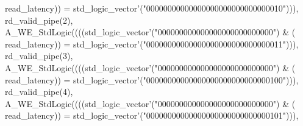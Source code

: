 \begin{DoxyCode}
{      read_latency}\textcolor{vhdlchar}{)}\textcolor{vhdlchar}{)} \textcolor{vhdlchar}{=} \textcolor{comment}{std\_logic\_vector}\textcolor{vhdlchar}{'}\textcolor{vhdlchar}{(}\textcolor{vhdllogic}{"00000000000000000000000000000010"}\textcolor{vhdlchar}{)}\textcolor{vhdlchar}{)}\textcolor{vhdlchar}{)}\textcolor{vhdlchar}{,} \textcolor{vhdlchar}{
      rd_valid_pipe}\textcolor{vhdlchar}{(}\textcolor{vhdllogic}{}\textcolor{vhdllogic}{2}\textcolor{vhdlchar}{)}\textcolor{vhdlchar}{,} \textcolor{vhdlchar}{A\_WE\_StdLogic}\textcolor{vhdlchar}{(}\textcolor{vhdlchar}{(}\textcolor{vhdlchar}{(}\textcolor{vhdlchar}{(}\textcolor{comment}{std\_logic\_vector}\textcolor{vhdlchar}{'}\textcolor{vhdlchar}{(}\textcolor{vhdllogic}{"000000000000000000000000000"}\textcolor{vhdlchar}{)} \textcolor{vhdlchar}{&} \textcolor{vhdlchar}{(}\textcolor{vhdlchar}{
      read_latency}\textcolor{vhdlchar}{)}\textcolor{vhdlchar}{)} \textcolor{vhdlchar}{=} \textcolor{comment}{std\_logic\_vector}\textcolor{vhdlchar}{'}\textcolor{vhdlchar}{(}\textcolor{vhdllogic}{"00000000000000000000000000000011"}\textcolor{vhdlchar}{)}\textcolor{vhdlchar}{)}\textcolor{vhdlchar}{)}\textcolor{vhdlchar}{,} \textcolor{vhdlchar}{
      rd_valid_pipe}\textcolor{vhdlchar}{(}\textcolor{vhdllogic}{}\textcolor{vhdllogic}{3}\textcolor{vhdlchar}{)}\textcolor{vhdlchar}{,} \textcolor{vhdlchar}{A\_WE\_StdLogic}\textcolor{vhdlchar}{(}\textcolor{vhdlchar}{(}\textcolor{vhdlchar}{(}\textcolor{vhdlchar}{(}\textcolor{comment}{std\_logic\_vector}\textcolor{vhdlchar}{'}\textcolor{vhdlchar}{(}\textcolor{vhdllogic}{"000000000000000000000000000"}\textcolor{vhdlchar}{)} \textcolor{vhdlchar}{&} \textcolor{vhdlchar}{(}\textcolor{vhdlchar}{
      read_latency}\textcolor{vhdlchar}{)}\textcolor{vhdlchar}{)} \textcolor{vhdlchar}{=} \textcolor{comment}{std\_logic\_vector}\textcolor{vhdlchar}{'}\textcolor{vhdlchar}{(}\textcolor{vhdllogic}{"00000000000000000000000000000100"}\textcolor{vhdlchar}{)}\textcolor{vhdlchar}{)}\textcolor{vhdlchar}{)}\textcolor{vhdlchar}{,} \textcolor{vhdlchar}{
      rd_valid_pipe}\textcolor{vhdlchar}{(}\textcolor{vhdllogic}{}\textcolor{vhdllogic}{4}\textcolor{vhdlchar}{)}\textcolor{vhdlchar}{,} \textcolor{vhdlchar}{A\_WE\_StdLogic}\textcolor{vhdlchar}{(}\textcolor{vhdlchar}{(}\textcolor{vhdlchar}{(}\textcolor{vhdlchar}{(}\textcolor{comment}{std\_logic\_vector}\textcolor{vhdlchar}{'}\textcolor{vhdlchar}{(}\textcolor{vhdllogic}{"000000000000000000000000000"}\textcolor{vhdlchar}{)} \textcolor{vhdlchar}{&} \textcolor{vhdlchar}{(}\textcolor{vhdlchar}{
      read_latency}\textcolor{vhdlchar}{)}\textcolor{vhdlchar}{)} \textcolor{vhdlchar}{=} \textcolor{comment}{std\_logic\_vector}\textcolor{vhdlchar}{'}\textcolor{vhdlchar}{(}\textcolor{vhdllogic}{"00000000000000000000000000000101"}\textcolor{vhdlchar}{)}\textcolor{vhdlchar}{)}\textcolor{vhdlchar}{)}\textcolor{vhdlchar}{,} \textcolor{vhdlchar}{
}
\end{DoxyCode}
